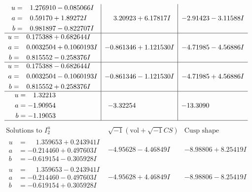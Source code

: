 \documentclass[1p]{elsarticle_modified}
\theoremstyle{definition}
\newcommand{\I}{\sqrt{-1}}
\begin{document}
$$\begin{array}{c|c|c}
\begin{aligned}
u &= \phantom{-}1.276910 - 0.085066 I \\
a &= \phantom{-}0.59170 + 1.89272 I \\
b &= \phantom{-}0.981897 - 0.822707 I\end{aligned}
 & \phantom{-}3.20923 + 6.17817 I & -2.91423 - 3.11588 I \\ \hline\begin{aligned}
u &= \phantom{-}0.175388 + 0.682644 I \\
a &= \phantom{-}0.0032504 + 0.1060193 I \\
b &= \phantom{-}0.815552 - 0.258376 I\end{aligned}
 & -0.861346 + 1.121530 I & -4.71985 - 4.56886 I \\ \hline\begin{aligned}
u &= \phantom{-}0.175388 - 0.682644 I \\
a &= \phantom{-}0.0032504 - 0.1060193 I \\
b &= \phantom{-}0.815552 + 0.258376 I\end{aligned}
 & -0.861346 - 1.121530 I & -4.71985 + 4.56886 I \\ \hline\begin{aligned}
u &= \phantom{-}1.32213\phantom{ +0.000000I} \\
a &= -1.90954\phantom{ +0.000000I} \\
b &= -1.19053\phantom{ +0.000000I}\end{aligned}
 & -3.32254\phantom{ +0.000000I} & -13.3090\phantom{ +0.000000I}\\
 \hline 
 \end{array}$$\newpage$$\begin{array}{c|c|c}  
\text{Solutions to }I^u_{2}& \I (\text{vol} + \sqrt{-1}CS) & \text{Cusp shape}\\
 \hline 
\begin{aligned}
u &= \phantom{-}1.359653 + 0.243941 I \\
a &= -0.214460 + 0.497603 I \\
b &= -0.619154 - 0.305928 I\end{aligned}
 & -4.95628 - 4.46849 I & -8.98806 + 8.25419 I \\ \hline\begin{aligned}
u &= \phantom{-}1.359653 - 0.243941 I \\
a &= -0.214460 - 0.497603 I \\
b &= -0.619154 + 0.305928 I\end{aligned}
 & -4.95628 + 4.46849 I & -8.98806 - 8.25419 I \\ \hline\begin{aligned}

\end{aligned}
\end{array}$$
\end{document}
